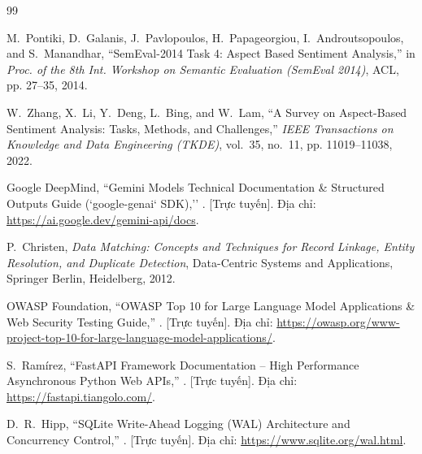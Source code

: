 \documentclass[12pt, a4paper, oneside]{book}
\begin{document}
\backmatter
\cleardoublepage
{}
{}

\begin{thebibliography}{99}

M.~Pontiki, D.~Galanis, J.~Pavlopoulos, H.~Papageorgiou, I.~Androutsopoulos, and S.~Manandhar,
\newblock ``SemEval-2014 Task 4: Aspect Based Sentiment Analysis,''
\newblock in \textit{Proc. of the 8th Int. Workshop on Semantic Evaluation (SemEval 2014)}, ACL, pp. 27--35, 2014.

W.~Zhang, X.~Li, Y.~Deng, L.~Bing, and W.~Lam,
\newblock ``A Survey on Aspect-Based Sentiment Analysis: Tasks, Methods, and Challenges,''
\newblock \textit{IEEE Transactions on Knowledge and Data Engineering (TKDE)}, vol.~35, no.~11, pp. 11019--11038, 2022.

Google DeepMind,
\newblock ``Gemini Models Technical Documentation \& Structured Outputs Guide (`google-genai` SDK),''
. [Trực tuyến]. Địa chỉ: \url{https://ai.google.dev/gemini-api/docs}.

P.~Christen,
\newblock \textit{Data Matching: Concepts and Techniques for Record Linkage, Entity Resolution, and Duplicate Detection},
\newblock Data-Centric Systems and Applications, Springer Berlin, Heidelberg, 2012.

OWASP Foundation,
\newblock ``OWASP Top 10 for Large Language Model Applications \& Web Security Testing Guide,''
. [Trực tuyến]. Địa chỉ: \url{https://owasp.org/www-project-top-10-for-large-language-model-applications/}.

S.~Ramírez,
\newblock ``FastAPI Framework Documentation -- High Performance Asynchronous Python Web APIs,''
. [Trực tuyến]. Địa chỉ: \url{https://fastapi.tiangolo.com/}.

D.~R.~Hipp,
\newblock ``SQLite Write-Ahead Logging (WAL) Architecture and Concurrency Control,''
. [Trực tuyến]. Địa chỉ: \url{https://www.sqlite.org/wal.html}.

\end{thebibliography}
\end{document}
